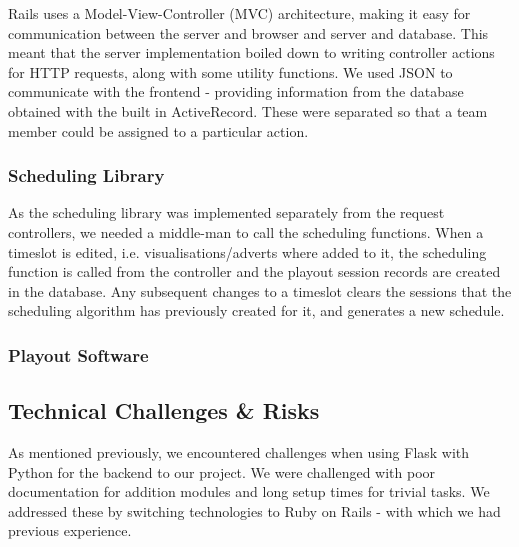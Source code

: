 \documentclass[a4paper, titlepage]{article}
\begin{document}
Rails uses a Model-View-Controller (MVC) architecture, making it easy for communication between the 
server and browser and server and database. This meant that the server implementation boiled down to
writing controller actions for HTTP requests, along with some utility functions. We used JSON to 
communicate with the frontend - providing information from the database obtained with the built in 
ActiveRecord. These were separated so that a team member could be assigned to a particular action.   



\subsubsection{Scheduling Library}


As the scheduling library was implemented separately from the request controllers,
we needed a middle-man to call the scheduling functions. When a timeslot is edited, i.e. 
visualisations/adverts where added to it, the scheduling function is called from
the controller and the playout session records are created in the database. Any 
subsequent changes to a timeslot clears the sessions that the scheduling algorithm 
has previously created for it, and generates a new schedule. 

\subsubsection{Playout Software}




\subsection{Technical Challenges \& Risks}

As mentioned previously, we encountered challenges when using Flask with Python for the backend to our 
project. We were challenged with poor documentation for addition modules and long setup times for 
trivial tasks. We addressed these by switching technologies to Ruby on Rails - with which we had 
previous experience. 
\end{document}
